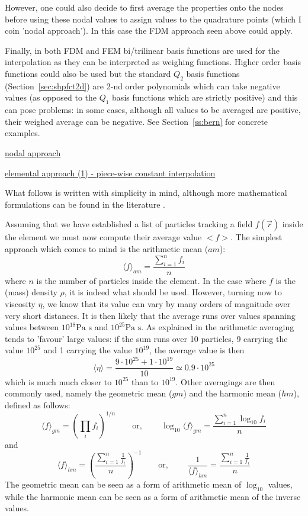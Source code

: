However, one could also decide to first average the properties onto the nodes
before using these nodal values to assign values to the quadrature points (which I coin 'nodal approach'). 
In this case the FDM approach seen above could apply. 

Finally, in both FDM and FEM bi/trilinear basis functions are used for the interpolation as 
they can be interpreted as weighing functions. Higher order basis functions could also be used 
but the standard $Q_2$ basis functions (Section~\ref{sec:shpfct2d})
are 2-nd order polynomials which can take negative values (as opposed to the $Q_1$ 
basis functions which are strictly positive)
and this can pose problems: in some cases, although all values to be averaged are positive, 
their weighed average can be negative.
See Section~\ref{ss:bern} for concrete examples.

\underline{nodal approach}

\underline{elemental approach (1) - piece-wise constant interpolation} 

What follows is written with simplicity in mind, although more mathematical formulations 
can be found in the literature \cite{galh18}.

Assuming that we have established a list of particles tracking a field $f(\vec r)$ inside the 
element 
we must now compute their average value $<f>$. 
The simplest approach which comes to mind is the arithmetic mean ($am$):
\[
\langle f\rangle_{am} = \frac{\sum\limits_{i=1}^n f_i}{n}
\]  
where $n$ is the number of particles inside the element.
In the case where $f$ is the (mass) density $\rho$, it is indeed what should be used. 
However, turning now to viscosity $\eta$, we know that its value can vary by many orders of magnitude 
over very short distances.
It is then likely that the average runs over values spanning values between 
$10^{18}\text{Pa s}$ and $10^{25} \text{Pa s}$.
As explained in \cite{scbe08} the arithmetic averaging tends to 'favour' large values: 
if the sum runs over 
10 particles, 9 carrying the value $10^{25}$ and 1 carrying the value $10^{19}$, 
the average value is then
\[
\langle\eta\rangle = \frac{9\cdot 10^{25}+1\cdot 10^{19}}{10} \simeq 0.9\cdot 10^{25}
\]
which is much much closer to $10^{25}$ than to $10^{19}$.
Other averagings are then commonly used, namely the geometric mean ($gm$)  and the 
harmonic mean ($hm$), defined as follows:
\[
\langle f\rangle_{gm} = \left( \prod_i f_i \right)^{1/n} 
\qquad
\text{or, }
\qquad
\log_{10} \langle f \rangle_{gm} = \frac{\sum\limits_{i=1}^{n} \log_{10} f_i }{n}  
\]
and 
\[
\langle f\rangle_{hm} = \left( \frac{\sum\limits_{i=1}^n \frac{1}{f_i} }{n}  \right)^{-1}
\qquad
\text{or, }
\qquad
\frac{1}{\langle f\rangle_{hm} } = \frac{\sum\limits_{i=1}^n  \frac{1}{f_i} }{n}  
\]
The geometric mean can be seen as a form of arithmetic mean of $\log_{10}$ values, 
while the harmonic mean can be seen as 
a form of arithmetic mean of the inverse values.

